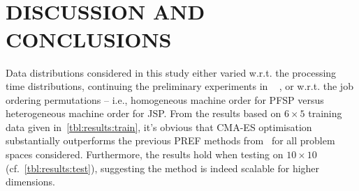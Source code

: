 \documentclass[a4paper,twoside]{article}
\begin{document}
\begin{table}[p]
\\
\\

\end{table}

\section{\uppercase{Discussion and conclusions}}\label{sec:disc}
Data distributions considered in this study either varied 
w.r.t. the processing time distributions, continuing the preliminary experiments in ~\cite{InRu11a} , or 
w.r.t. the job ordering permutations -- i.e., homogeneous machine order for PFSP versus heterogeneous machine order for JSP. 
From the results based on $6\times5$ training data given  in~\cref{tbl:results:train}, it's obvious that CMA-ES optimisation substantially outperforms the previous PREF methods from~\cite{InRu11a} for all problem spaces considered. Furthermore, the results hold when testing on $10\times10$ (cf.~\cref{tbl:results:test}), suggesting the method is indeed  scalable for higher dimensions. 
\end{document}
